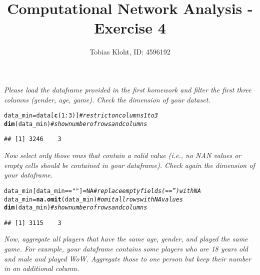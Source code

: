 \documentclass{article}\usepackage[]{graphicx}\usepackage[]{color}
\makeatletter
\newcommand{\hlnum}[1]{\textcolor[rgb]{0.686,0.059,0.569}{#1}}%
\newcommand{\hlstr}[1]{\textcolor[rgb]{0.192,0.494,0.8}{#1}}%
\newcommand{\hlcom}[1]{\textcolor[rgb]{0.678,0.584,0.686}{\textit{#1}}}%
\newcommand{\hlopt}[1]{\textcolor[rgb]{0,0,0}{#1}}%
\newcommand{\hlstd}[1]{\textcolor[rgb]{0.345,0.345,0.345}{#1}}%
\newcommand{\hlkwb}[1]{\textcolor[rgb]{0.69,0.353,0.396}{#1}}%
\newcommand{\hlkwd}[1]{\textcolor[rgb]{0.737,0.353,0.396}{\textbf{#1}}}%
\newenvironment{kframe}{%
 \def\at@end@of@kframe{}%
 \ifinner\ifhmode%
  \def\at@end@of@kframe{\end{minipage}}%
  \begin{minipage}{\columnwidth}%
 \fi\fi%
 \def\FrameCommand##1{\hskip\@totalleftmargin \hskip-\fboxsep
 \colorbox{shadecolor}{##1}\hskip-\fboxsep
     \hskip-\linewidth \hskip-\@totalleftmargin \hskip\columnwidth}%
 \MakeFramed {\advance\hsize-\width
   \@totalleftmargin\z@ \linewidth\hsize
   \@setminipage}}%
 {\par\unskip\endMakeFramed%
 \at@end@of@kframe}
\newenvironment{knitrout}{}{} %
\makeatother
\begin{document}
\title{Computational Network Analysis - Exercise 4}
\author{Tobias Kloht, ID: 4596192}
\maketitle
\section{}
\emph{Please load the dataframe provided in the first homework and filter the first three columns (gender, age, game). Check the dimension of your dataset.}
\begin{knitrout}
\color{fgcolor}\begin{kframe}
\begin{alltt}
\hlstd{data_min} \hlkwb{=} \hlstd{data[}\hlkwd{c}\hlstd{(}\hlnum{1}\hlopt{:}\hlnum{3}\hlstd{)]}  \hlcom{# restrict on columns 1 to 3}
\hlkwd{dim}\hlstd{(data_min)}  \hlcom{# show number of rows and columns}
\end{alltt}
\begin{verbatim}
## [1] 3246    3
\end{verbatim}
\end{kframe}
\end{knitrout}



\emph{Now select only those rows that contain a valid value (i.e., no NAN values or empty cells should be contained in your dataframe). Check again the dimension of your dataframe. }
\begin{knitrout}
\color{fgcolor}\begin{kframe}
\begin{alltt}
\hlstd{data_min[data_min} \hlopt{==} \hlstr{""}\hlstd{]} \hlkwb{=} \hlnum{NA}  \hlcom{# replace empty fields (=='') with NA}
\hlstd{data_min} \hlkwb{=} \hlkwd{na.omit}\hlstd{(data_min)}  \hlcom{# omit all rows with NA values }
\hlkwd{dim}\hlstd{(data_min)}  \hlcom{# show number of rows and columns}
\end{alltt}
\begin{verbatim}
## [1] 3115    3
\end{verbatim}
\end{kframe}
\end{knitrout}

\emph{Now, aggregate all players that have the same age, gender, and played the same game. For example, your dataframe contains some players who are 18 years old and male and played WoW. Aggregate those to one person but keep their number in an additional column. }
\end{document}
